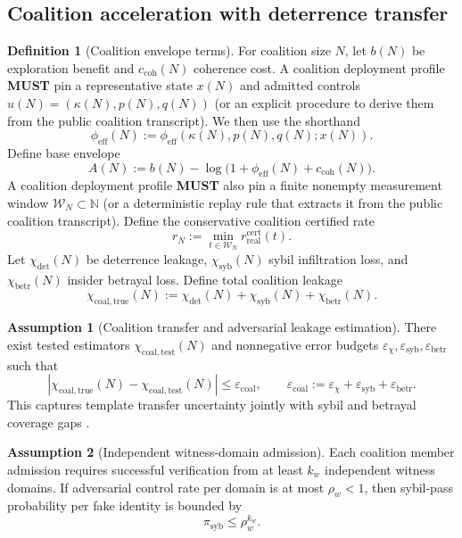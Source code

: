 \documentclass[11pt,a4paper]{article}
\newcommand{\MUST}{\textbf{MUST}}
\newcommand{\N}{\mathbb{N}}
\newcommand{\eps}{\varepsilon}
\theoremstyle{definition}
\newtheorem{definition}{Definition}
\newtheorem{assumption}{Assumption}
\theoremstyle{remark}
\begin{document}
\subsection{Coalition acceleration with deterrence transfer}
\begin{definition}[Coalition envelope terms]\label{def:coalition_envelope_terms}
For coalition size $N$, let $b(N)$ be exploration benefit and $c_{\mathrm{coh}}(N)$ coherence cost.
A coalition deployment profile \MUST{} pin a representative state $x(N)$ and admitted controls $u(N)=(\kappa(N),p(N),q(N))$ (or an explicit procedure to derive them from the public coalition transcript).
We then use the shorthand
\[
\phi_{\mathrm{eff}}(N):=\phi_{\mathrm{eff}}(\kappa(N),p(N),q(N);x(N)).
\]
Define base envelope
\[
A(N):=b(N)-\log\!\big(1+\phi_{\mathrm{eff}}(N)+c_{\mathrm{coh}}(N)\big).
\]
A coalition deployment profile \MUST{} also pin a finite nonempty measurement window $\mathcal W_N\subset\N$ (or a deterministic replay rule that extracts it from the public coalition transcript).
Define the conservative coalition certified rate
\[
r_N:=\min_{t\in\mathcal W_N} r_{\mathrm{real}}^{\mathrm{cert}}(t).
\]
Let $\chi_{\mathrm{det}}(N)$ be deterrence leakage, $\chi_{\mathrm{syb}}(N)$ sybil infiltration loss, and $\chi_{\mathrm{betr}}(N)$ insider betrayal loss.
Define total coalition leakage
\[
\chi_{\mathrm{coal,true}}(N):=\chi_{\mathrm{det}}(N)+\chi_{\mathrm{syb}}(N)+\chi_{\mathrm{betr}}(N).
\]
\end{definition}

\begin{assumption}[Coalition transfer and adversarial leakage estimation]\label{ass:coverage}
There exist tested estimators $\chi_{\mathrm{coal,test}}(N)$ and nonnegative error budgets $\eps_{\chi},\eps_{\mathrm{syb}},\eps_{\mathrm{betr}}$ such that
\[
\left|\chi_{\mathrm{coal,true}}(N)-\chi_{\mathrm{coal,test}}(N)\right|
\le
\eps_{\mathrm{coal}},
\qquad
\eps_{\mathrm{coal}}:=\eps_{\chi}+\eps_{\mathrm{syb}}+\eps_{\mathrm{betr}}.
\]
This captures template transfer uncertainty jointly with sybil and betrayal coverage gaps \cite{Takahashi2026StructuralRisk,Takahashi2026DePINMesh,Takahashi2026NoJudgeContainment}.
\end{assumption}

\begin{assumption}[Independent witness-domain admission]\label{ass:sybil}
Each coalition member admission requires successful verification from at least $k_w$ independent witness domains.
If adversarial control rate per domain is at most $\rho_w<1$, then sybil-pass probability per fake identity is bounded by
\[
\pi_{\mathrm{syb}}\le \rho_w^{k_w}.
\]
\end{assumption}
\end{document}
